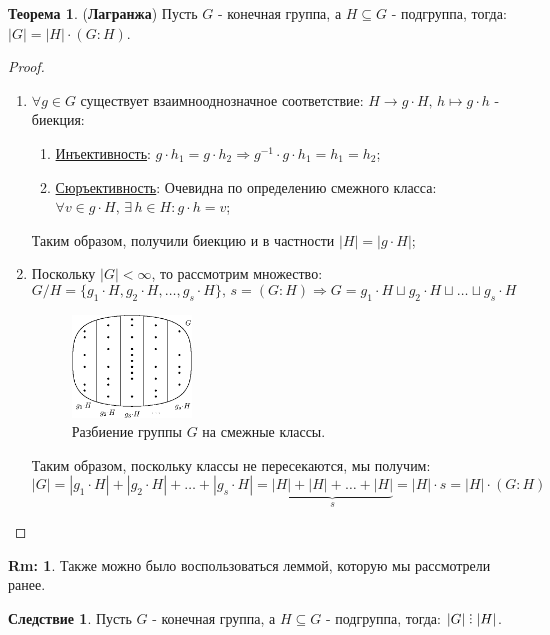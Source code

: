 \documentclass[12pt]{article}
\theoremstyle{definition}
\newtheorem{rem}{Rm:}
\newtheorem{theorem}{Теорема}
\newtheorem{corollary}{Следствие}
\DeclareRobustCommand{\divby}{%
	\mathrel{\text{\vbox{\baselineskip.65ex\lineskiplimit0pt\hbox{.}\hbox{.}\hbox{.}}}}%
}
\begin{document}
\begin{theorem}(\textbf{Лагранжа})
	Пусть $G$ - конечная группа, а $H \subseteq G$ - подгруппа, тогда: $|G|= |H|{\cdot}(G\colon H)$.
\end{theorem}
\begin{proof}\hfill
	\begin{enumerate}[label=\arabic*)]
		\item $\forall g \in G$ существует взаимнооднозначное соответствие: $H \to g{\cdot}H,\, h \mapsto g{\cdot}h$ - биекция:
		\begin{enumerate}[label=(\arabic*)]
			\item \uline{Инъективность}: $g{\cdot}h_1 = g{\cdot}h_2 \Rightarrow g^{-1}{\cdot}g{\cdot}h_1 = h_1 = h_2$;
			\item \uline{Сюръективность}: Очевидна по определению смежного класса: $\forall v \in g{\cdot}H, \, \exists \, h \in H \colon g{\cdot}h = v$;
		\end{enumerate}
		Таким образом, получили биекцию и в частности $|H| = |g{\cdot}H|$;
		\item Поскольку $|G| < \infty$, то рассмотрим множество:
		$$
			G/H = \{g_1{\cdot}H, g_2{\cdot}H, \dotsc, g_s{\cdot}H\},\, s = (G \colon H) \Rightarrow G = g_1{\cdot}H \sqcup g_2{\cdot}H \sqcup \dotsc \sqcup g_s{\cdot}H
		$$
		\begin{figure}[H]
			\centering
			\includegraphics[width=0.3\textwidth]{AL1L24_3.eps}
			\caption{Разбиение группы $G$ на смежные классы.}
			\label{24_3}
		\end{figure}
		Таким образом, поскольку классы не пересекаются, мы получим:
		$$
			|G| = |g_1{\cdot}H| + |g_2{\cdot}H| + \dotsc + |g_s{\cdot}H| = \underbrace{|H| + |H| + \dotsc + |H|}_{s} = |H|{\cdot}s = |H|{\cdot}(G\colon H)
		$$
	\end{enumerate}
\end{proof}
\begin{rem}
	Также можно было воспользоваться леммой, которую мы рассмотрели ранее.
\end{rem}
\begin{corollary}
	Пусть $G$ - конечная группа, а $H \subseteq G$ - подгруппа, тогда: $|G| \divby|H|$.
\end{corollary}
\end{document}
